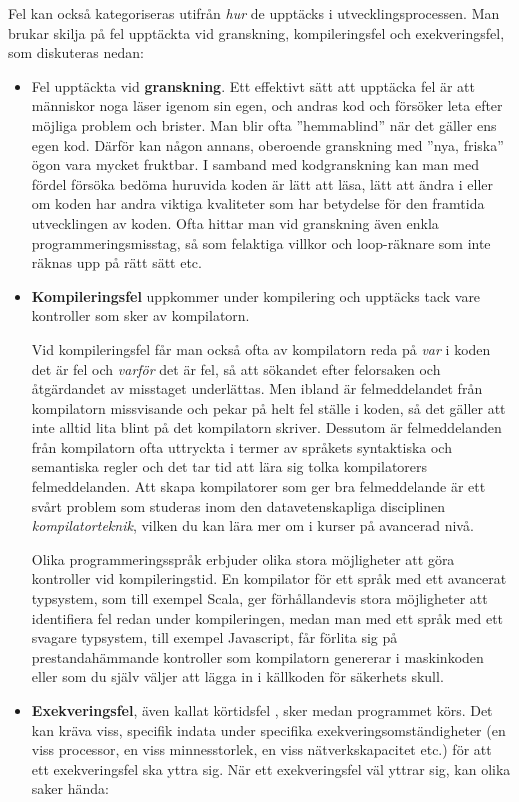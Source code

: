 Fel kan också kategoriseras utifrån \emph{hur} de upptäcks i utvecklingsprocessen. Man brukar skilja på fel upptäckta vid granskning, kompileringsfel och exekveringsfel, som diskuteras nedan:
\begin{itemize}
\item Fel upptäckta vid \textbf{granskning}. Ett effektivt sätt att upptäcka fel är att människor noga läser igenom sin egen, och andras kod och försöker leta efter möjliga problem och brister. Man blir ofta ''hemmablind'' när det gäller ens egen kod. Därför kan någon annans, oberoende granskning med ''nya, friska'' ögon vara mycket fruktbar.  I samband med kodgranskning kan man med fördel försöka bedöma  huruvida koden är lätt att läsa, lätt att ändra i eller om koden har andra viktiga kvaliteter som har betydelse för den framtida utvecklingen av koden. Ofta hittar man vid granskning även enkla programmeringsmisstag, så som felaktiga villkor och loop-räknare som inte räknas upp på rätt sätt etc.
  
\item \textbf{Kompileringsfel} uppkommer under kompilering och upptäcks tack vare kontroller som sker av  kompilatorn. 

Vid kompileringsfel får man också ofta av kompilatorn reda på \emph{var} i koden det är fel och \emph{varför} det är fel, så att sökandet efter felorsaken och åtgärdandet av misstaget underlättas. Men ibland är felmeddelandet från kompilatorn missvisande och pekar på helt fel ställe i koden, så det gäller att inte alltid lita blint på det kompilatorn skriver. Dessutom är felmeddelanden från kompilatorn ofta uttryckta i termer av språkets syntaktiska och semantiska regler och det tar tid att lära sig tolka kompilatorers felmeddelanden. Att skapa kompilatorer som ger bra felmeddelande är ett svårt problem som studeras inom den datavetenskapliga disciplinen \textit{kompilatorteknik}, vilken du kan lära mer om i kurser på avancerad nivå.

Olika programmeringsspråk erbjuder olika stora möjligheter att göra kontroller vid kompileringstid. En kompilator för ett språk med ett avancerat typsystem, som till exempel Scala, ger förhållandevis stora möjligheter att identifiera fel redan under kompileringen, medan man med ett språk med ett svagare typsystem, till exempel Javascript, får förlita sig på prestandahämmande kontroller som kompilatorn genererar i maskinkoden eller som du själv väljer att lägga in i källkoden för säkerhets skull. 
  
\item \textbf{Exekveringsfel}, även kallat körtidsfel , sker medan programmet körs. Det kan kräva viss, specifik indata under specifika exekveringsomständigheter (en viss processor, en viss minnesstorlek, en viss nätverkskapacitet etc.) för att ett exekveringsfel ska yttra sig. När ett exekveringsfel väl yttrar sig, kan olika saker hända:


\end{itemize}

